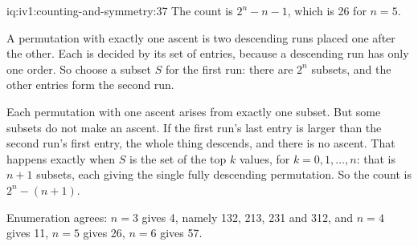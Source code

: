 \enlargethispage{-3\baselineskip}%
\begin{solution}{iq:iv1:counting-and-symmetry:37}
The count is $2^n - n - 1$, which is 26 for $n = 5$.

A permutation with exactly one ascent is two descending runs placed one after the other. Each is decided by its set of entries, because a descending run has only one order. So choose a subset $S$ for the first run: there are $2^n$ subsets, and the other entries form the second run.

Each permutation with one ascent arises from exactly one subset. But some subsets do not make an ascent. If the first run's last entry is larger than the second run's first entry, the whole thing descends, and there is no ascent. That happens exactly when $S$ is the set of the top $k$ values, for $k = 0, 1, \dots, n$: that is $n + 1$ subsets, each giving the single fully descending permutation. So the count is $2^n - (n + 1)$.

Enumeration agrees: $n = 3$ gives 4, namely 132, 213, 231 and 312, and $n = 4$ gives 11, $n = 5$ gives 26, $n = 6$ gives 57.

\end{solution}

